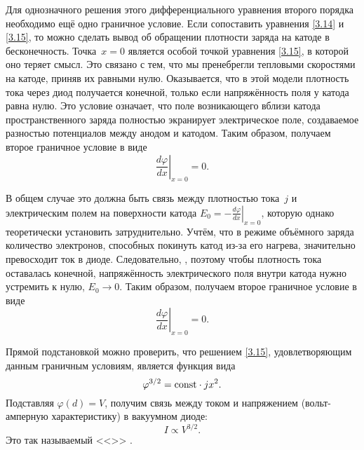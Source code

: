 Для однозначного решения этого дифференциального уравнения второго порядка
необходимо ещё одно граничное условие.
 Если сопоставить уравнения \eqref{3.14} и \eqref{3.15}, то можно сделать вывод
об обращении плотности заряда на катоде в бесконечность. Точка~$x=0$ является
особой точкой уравнения \eqref{3.15}, в которой оно теряет смысл. Это связано с
тем, что мы пренебрегли тепловыми скоростями на катоде, приняв их равными нулю.
Оказывается, что в этой модели плотность тока через диод получается конечной,
только если напряжённость поля у катода равна нулю.
Это условие означает, что поле возникающего вблизи катода пространственного заряда полностью экранирует
электрическое поле, создаваемое разностью потенциалов между анодом и катодом.
Таким образом, получаем второе граничное условие в виде
\begin{equation*}
    \left.\frac{d\varphi}{dx}\right|_{x = 0}=0.
\end{equation*}
\todo[inline]{<---}

В общем случае это должна быть связь между плотностью тока~$j$ и электрическим
полем на поверхности катода $E_0 = -\left.\frac{d\varphi}{dx}\right|_{x=0}$,
которую однако  теоретически установить затруднительно.
Учтём, что в режиме объёмного заряда количество электронов, способных покинуть
катод из-за его нагрева, значительно превосходит ток в диоде.
Следовательно, ,
поэтому чтобы плотность тока оставалась конечной,
напряжённость электрического поля внутри катода нужно устремить к нулю, $E_0\to 0$.
Таким образом, получаем второе граничное условие в виде
\begin{equation*}
    \left.\frac{d\varphi}{dx}\right|_{x = 0}=0.
\end{equation*}

Прямой подстановкой можно проверить, что решением \eqref{3.15},
удовлетворяющим данным граничным условиям, является функция вида
\begin{equation*}
    \varphi^{3/2} =\mathrm{const} \cdot j x^2.
\end{equation*}
Подставляя $\varphi(d)=V$, получим связь между током и напряжением
(вольт-амперную характеристику) в вакуумном диоде:
\begin{equation}
    I \propto V^{3/2}.
\end{equation}
Это так называемый <<>> .

